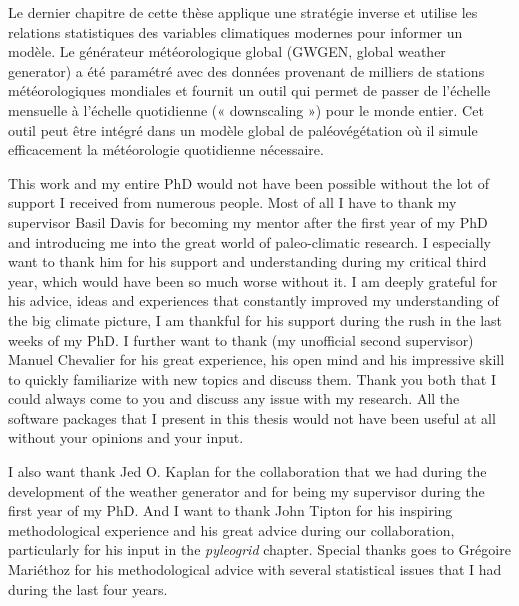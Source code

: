 \documentclass[
11pt, %
english, %
singlespacing, %
headsepline, %
]{MastersDoctoralThesis} %
\begin{document}
\begin{NoHyper}
\begin{thesisabstract}[]
Le dernier chapitre de cette thèse applique une stratégie inverse et utilise les relations statistiques des variables climatiques modernes pour informer un modèle. Le générateur météorologique global (GWGEN, global weather generator) a été paramétré avec des données provenant de milliers de stations météorologiques mondiales et fournit un outil qui permet de passer de l’échelle mensuelle à l’échelle quotidienne (« downscaling ») pour le monde entier. Cet outil peut être intégré dans un modèle global de paléovégétation où il simule efficacement la météorologie quotidienne nécessaire.
\end{thesisabstract}

\renewcommand{\abstractname}{\Oldabstractname}
\renewcommand{\univname}{\Oldunivname}
\renewcommand{\facname}{\Oldfacname}
\renewcommand{\deptname}{\Olddeptname}
\renewcommand{\degreename}{\Olddegreename}


\begin{acknowledgements}
\addchaptertocentry{\acknowledgementname} %
This work and my entire PhD would not have been possible without the lot of support I received from numerous people. Most of all I have to thank my supervisor Basil Davis for becoming my mentor after the first year of my PhD and introducing me into the great world of paleo-climatic research. I especially want to thank him for his support and understanding during my critical third year, which would have been so much worse without it. I am deeply grateful for his advice, ideas and experiences that constantly improved my understanding of the big climate picture, I am thankful for his support during the rush in the last weeks of my PhD. I further want to thank (my unofficial second supervisor) Manuel Chevalier for his great experience, his open mind and his impressive skill to quickly familiarize with new topics and discuss them. Thank you both that I could always come to you and discuss any issue with my research. All the software packages that I present in this thesis would not have been useful at all without your opinions and your input.

I also want thank Jed O. Kaplan for the collaboration that we had during the development of the weather generator and for being my supervisor during the first year of my PhD. And I want to thank John Tipton for his inspiring methodological experience and his great advice during our collaboration, particularly for his input in the \textit{pyleogrid} chapter. Special thanks goes to Grégoire Mariéthoz for his methodological advice with several statistical issues that I had during the last four years.


\end{acknowledgements}
\end{NoHyper}
\end{document}
